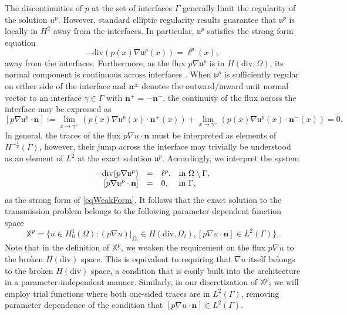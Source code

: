 \documentclass[oneside]{article}
\begin{document}
\noindent The discontinuities of $p$ at the set of interfaces $\Gamma$ generally limit the regularity of the solution $u^p$. However, standard elliptic regularity results \cite{evans2022partial} %
guarantee that $\mathfrak{u}^p$ is locally in $H^2$ away from the interfaces. In particular, $\mathfrak{u}^p$ satisfies the strong form equation 
\begin{equation}
    -\text{div}(p(x)\nabla \mathfrak{u}^p(x)) = \ell^p(x), 
\end{equation}
away from the interfaces. Furthermore, as the flux $p \nabla \mathfrak{u}^p$ is in $H(\text{div};\Omega)$, its normal component is continuous across interfaces \cite{boffi2013mixed}.
When $\mathfrak{u}^p$ is sufficiently regular on either side of the interface and $\mathbf{n}^{\pm}$ denotes the outward/inward unit normal vector to an interface $\gamma\in\Gamma$ with $\mathbf{n}^+=-\mathbf{n}^-$, the continuity of the flux across the interface may be expressed as 
\begin{equation}
    \left[p\nabla \mathfrak{u}^p\cdot \mathbf{n}\right]:=\lim\limits_{x\to \gamma^+}(p(x)\nabla \mathfrak{u}^p(x)\cdot \mathbf{n}^+(x))+\lim\limits_{x\to\gamma^-}(p(x)\nabla \mathfrak{u}^p(x)\cdot \mathbf{n}^-(x))=0.
\end{equation}
In general, the traces of the flux $p\nabla u\cdot \mathbf{n}$ must be interpreted as elements of $H^{-\frac{1}{2}}(\Gamma)$, however, their jump across the interface may trivially be understood as an element of $L^2$ at the exact solution $\mathfrak{u}^p$. Accordingly, we interpret the system
\begin{equation}\label{eq2_strong}
\begin{array}{r c l l}
-\text{div}(p\nabla \mathfrak{u}^p) &= &\ell ^p,&  \text{in }\Omega\setminus\Gamma,\\
\left[p\nabla \mathfrak{u}^p\cdot \mathbf{n}\right]&=& 0,& \text{in }\Gamma,
\end{array}
\end{equation}
as the strong form of \eqref{eqWeakForm}. It follows that the exact solution to the transmission problem belongs to the following parameter-dependent function space 
\begin{equation}\label{eq2_X_p space}
    \mathbb{X}^p = \{u\in H^1_0(\Omega): (p\nabla u)|_{\Omega_i}\in H(\text{div},\Omega_i), [p\nabla u\cdot \mathbf{n}]\in L^2(\Gamma)\}. 
\end{equation}
Note that in the definition of $\mathbb{X}^p$, we weaken the requirement on the flux $p \nabla u$ to the broken $H(\text{div})$ space. This is equivalent to requiring that $\nabla u$ itself belongs to the broken $H(\text{div})$ space, a condition that is easily built into the architecture in a parameter-independent manner. Similarly, in our discretization of $\mathbb{X}^p$, we will employ trial functions where both one-sided traces are in $L^2(\Gamma)$, removing parameter dependence of the condition that $[p\nabla u\cdot \mathbf{n}]\in L^2(\Gamma)$.
\end{document}
